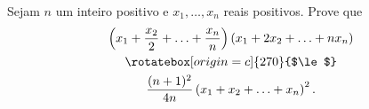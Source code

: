Sejam $n$ um inteiro positivo e $x_1, \ldots, x_n$ reais positivos.
Prove que \begin{gather*}
	\left(x_1 + \frac{x_2}{2} + \ldots + \frac{x_n}{n}\right) \left(x_1 + 2x_2 + \ldots + nx_n\right) \\
	\rotatebox[origin=c]{270}{$\le$} \\
	\frac{(n+1)^2}{4n} \left(x_1 + x_2 + \ldots + x_n\right)^2.
\end{gather*}

